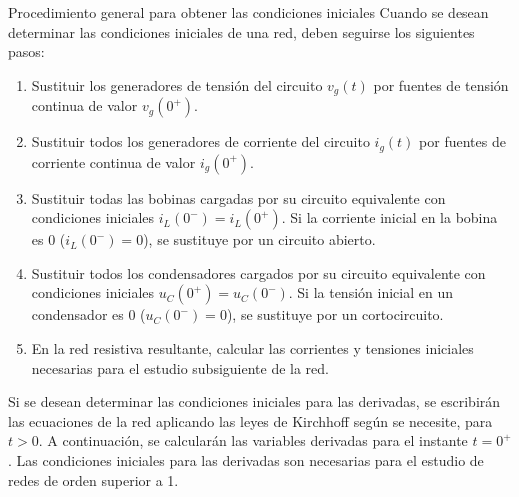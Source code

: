 \documentclass[11pt]{book} %
\makeatletter
\numberwithin{dummy}{section}
\theoremstyle{ocrenumbox}
\theoremstyle{blacknumex}
\newtheorem{exampleT}{Example}[chapter]
\theoremstyle{blacknumbox}
\theoremstyle{ocrenum}
\newenvironment{example}{\begin{exampleT}}{\hfill{\tiny\ensuremath{\blacksquare}}\end{exampleT}}
\renewcommand{\subsection}{\@startsection {subsection}{2}{\z@}
{-3ex \@plus -0.1ex \@minus -.4ex}
{0.5ex \@plus.2ex }
{\normalfont\sffamily\bfseries}}
\makeatother
\begin{document}
	\subsection{Procedimiento general para obtener las condiciones iniciales}
	Cuando se desean determinar las condiciones iniciales de una red, deben seguirse los siguientes pasos:
	\begin{enumerate}
		\item Sustituir los generadores de tensión del circuito $v_g(t)$ por fuentes de tensión continua de valor $v_g(0^+)$.
		\item Sustituir todos los generadores de corriente del circuito $i_g(t)$ por fuentes de corriente continua de valor $i_g(0^+)$.
		\item Sustituir todas las bobinas cargadas por su circuito equivalente con condiciones iniciales $i_L(0^-)=i_L(0^+)$. Si la corriente inicial en la bobina es 0 ($i_L(0^-)=0$), se sustituye por un circuito abierto.
		\item Sustituir todos los condensadores cargados por su circuito equivalente con condiciones iniciales $u_C(0^+)=u_C(0^-)$. Si la tensión inicial en un condensador es 0 ($u_C(0^-)=0$), se sustituye por un cortocircuito.
		\item En la red resistiva resultante, calcular las corrientes y tensiones iniciales necesarias para el estudio subsiguiente de la red.
	\end{enumerate}
	Si se desean determinar las condiciones iniciales para las derivadas, se escribirán las ecuaciones de la red aplicando las leyes de Kirchhoff según se necesite, para $t>0$. A continuación, se calcularán las variables derivadas para el instante $t=0^+$. Las condiciones iniciales para las derivadas son necesarias para el estudio de redes de orden superior a 1. 
	
		
\end{document}
